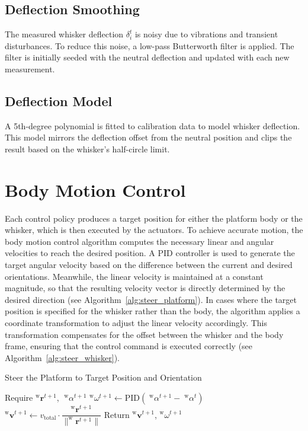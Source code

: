 \subsection{Deflection Smoothing}

The measured whisker deflection \(\delta_{i}^{t}\) is noisy due to vibrations and transient disturbances.
To reduce this noise, a low-pass Butterworth filter is applied.
The filter is initially seeded with the neutral deflection and updated with each new measurement.

\subsection{Deflection Model}

A 5th-degree polynomial is fitted to calibration data to model whisker deflection.
This model mirrors the deflection offset from the neutral position and clips the result based on the whisker's half-circle limit.



\section{Body Motion Control}

Each control policy produces a target position for either the platform body or the whisker, which is then executed by the actuators.
To achieve accurate motion, the body motion control algorithm computes the necessary linear and angular velocities to reach the desired position.
A PID controller is used to generate the target angular velocity based on the difference between the current and desired orientations.
Meanwhile, the linear velocity is maintained at a constant magnitude, so that the resulting velocity vector is directly determined by the desired direction (see Algorithm~\ref{alg:steer_platform}).
In cases where the target position is specified for the whisker rather than the body, the algorithm applies a coordinate transformation to adjust the linear velocity accordingly.
This transformation compensates for the offset between the whisker and the body frame, ensuring that the control command is executed correctly (see Algorithm~\ref{alg:steer_whisker}).


\begin{algorithm}[htb]
    \caption{Steer the Platform to Target Position and Orientation}
    \begin{algorithmic}
        \State Require \(^{\mathrm{w}}\boldsymbol{r}^{t+1}\), \(\;^{\mathrm{w}}\alpha^{t+1}\)
        \State \(^{\mathrm{w}}\omega^{t+1} \gets \mathrm{PID}(\;^{\mathrm{w}}\alpha^{t+1} - \;^{\mathrm{w}}\alpha^{t})\)
        \State \(^{\mathrm{w}}\boldsymbol{v}^{t+1} \gets v_{\mathrm{total}} \cdot \dfrac{^{\mathrm{w}}\boldsymbol{r}^{t+1}}{\|^{\mathrm{w}}\boldsymbol{r}^{t+1}\|}\)
        \State Return \(^{\mathrm{w}}\boldsymbol{v}^{t+1}\), \(^{\mathrm{w}}\omega^{t+1}\)
    \end{algorithmic}
    \label{alg:steer_platform}
\end{algorithm}

